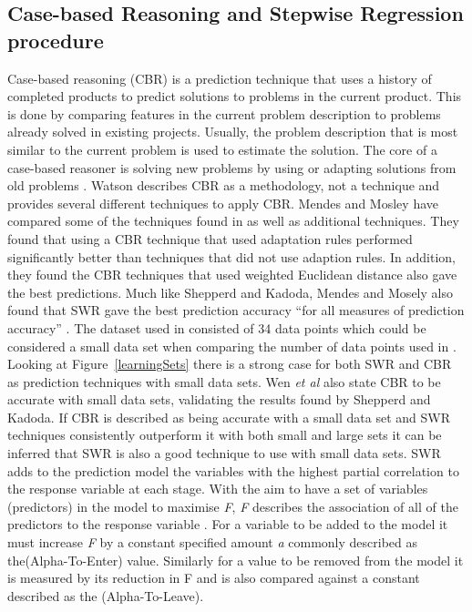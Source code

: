 \documentclass[journal]{IEEEtran}
\begin{document}
\subsection{Case-based Reasoning and Stepwise Regression procedure}
Case-based reasoning (CBR) is a prediction technique that uses a history of completed products to predict solutions to problems in the current product. This is done by comparing features in the current problem description to problems already solved in existing projects. Usually, the problem description that is most similar to the current problem is used to estimate the solution\cite{watson1998applying, mendes2002further}. The core of a case-based reasoner is solving new problems by using or adapting solutions from old problems \cite[p. 1]{riesbeck2013inside}. Watson \cite{watson1999case} describes CBR as a methodology, not a technique and provides several different techniques to apply CBR. Mendes and Mosley\cite{mendes2002further} have compared some of the techniques found in \cite{watson1999case} as well as additional techniques. They found that using a CBR technique that used adaptation rules performed significantly better than techniques that did not use adaption rules. In addition, they found the CBR techniques that used weighted Euclidean distance also gave the best predictions. Much like Shepperd and Kadoda\cite{shepperd2001comparing}, Mendes and Mosely\cite{mendes2002further} also found that SWR gave the best prediction accuracy ``for all measures of prediction accuracy'' \cite[p. 11]{mendes2002further}. The dataset used in \cite{mendes2002further} consisted of 34 data points which could be considered a small data set when comparing the number of data points used in \cite{hazarika1998neural}. Looking at Figure~\ref{learningSets}  there is a strong case for both SWR and CBR as prediction techniques with small data sets. Wen \textit{et al}\cite{wen2012systematic} also state CBR to be accurate with small data sets, validating the results found by Shepperd and Kadoda\cite{shepperd2001comparing}. If CBR is described as being accurate with a small data set \cite{wen2012systematic} and SWR techniques consistently outperform it with both small and large sets \cite{shepperd2001comparing,mendes2002further}it can be inferred that SWR is also a good technique to use with small data sets. 
SWR adds to the prediction model the variables with the highest partial correlation to the response variable at each stage\cite{schroeder2016understanding}. With the aim to have a set of variables (predictors) in the model to maximise \textit{F}, \textit{F} describes the association of all of the predictors to the response variable \cite{schroeder2016understanding}. For a variable to be added to the model it must increase \textit{F} by a constant specified amount \textit{a} commonly described as the(Alpha-To-Enter) value. Similarly for a value to be removed from the model it is measured by its reduction in F and is also compared against a constant described as the (Alpha-To-Leave).
\end{document}
